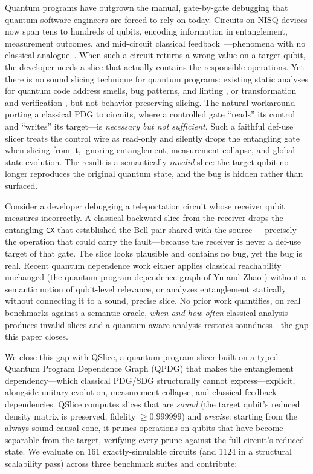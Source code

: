 \documentclass[10pt,conference]{IEEEtran}
\theoremstyle{definition}
\begin{document}
Quantum programs have outgrown the manual, gate-by-gate debugging that quantum software engineers are forced to rely on today. Circuits on NISQ devices now span tens to hundreds of qubits, encoding information in entanglement, measurement outcomes, and mid-circuit classical feedback~\cite{lavrijsen2020classical}---phenomena with no classical analogue~\cite{nielsen2010quantum, horodecki2009entanglement, cross2022openqasm3}. When such a circuit returns a wrong value on a target qubit, the developer needs a slice that actually contains the responsible operations. Yet there is no sound slicing technique for quantum programs: existing static analyses for quantum code address smells, bug patterns, and linting \cite{zhao2021bugpatterns, zhao2023qchecker, paltenghi2024lintq, nayak2023qpac}, or transformation and verification \cite{behler2025static, cho2026verifying}, but not behavior-preserving slicing. The natural workaround---porting a classical PDG to circuits, where a controlled gate ``reads'' its control and ``writes'' its target---is \emph{necessary but not sufficient}. Such a faithful def-use slicer treats the control wire as read-only and silently drops the entangling gate when slicing from it, ignoring entanglement, measurement collapse, and global state evolution. The result is a semantically \emph{invalid} slice: the target qubit no longer reproduces the original quantum state, and the bug is hidden rather than surfaced.

Consider a developer debugging a teleportation circuit whose receiver qubit measures incorrectly. A classical backward slice from the receiver drops the entangling \texttt{CX} that established the Bell pair shared with the source~---precisely the operation that could carry the fault---because the receiver is never a def-use target of that gate. The slice looks plausible and contains no bug, yet the bug is real. Recent quantum dependence work either applies classical reachability unchanged (the quantum program dependence graph of Yu and Zhao \cite{yu2025qpdg}) without a semantic notion of qubit-level relevance, or analyzes entanglement statically \cite{xia2025entanglement} without connecting it to a sound, precise slice. No prior work quantifies, on real benchmarks against a semantic oracle, \emph{when and how often} classical analysis produces invalid slices and a quantum-aware analysis restores soundness---the gap this paper closes.

We close this gap with QSlice, a quantum program slicer built on a typed Quantum Program Dependence Graph (QPDG) that makes the entanglement dependency---which classical PDG/SDG structurally cannot express---explicit, alongside unitary-evolution, measurement-collapse, and classical-feedback dependencies. QSlice computes slices that are \emph{sound} (the target qubit's reduced density matrix is preserved, fidelity $\geq 0.999999$) and \emph{precise}: starting from the always-sound causal cone, it prunes operations on qubits that have become separable from the target, verifying every prune against the full circuit's reduced state. We evaluate on 161 exactly-simulable circuits (and 1124 in a structural scalability pass) across three benchmark suites and contribute:
\end{document}
